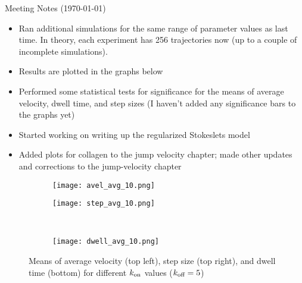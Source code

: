 \documentclass{article}
\newcommand{\tn}{\textnormal}
\begin{document}
\pagestyle{plain}

\begin{center}
  {\Large Meeting Notes (\today)}
\end{center}

\begin{itemize}
\item Ran additional simulations for the same range of parameter
  values as last time. In theory, each experiment has 256 trajectories
  now (up to a couple of incomplete simulations). 
\item Results are plotted in the graphs below
\item Performed some statistical tests for significance for the
  means of average velocity, dwell time, and step sizes (I haven't
  added any significance bars to the graphs yet)
\item Started working on writing up the regularized Stokeslets model
\item Added plots for collagen to the jump velocity chapter; made 
  other updates and corrections to the jump-velocity chapter
\end{itemize}

\begin{figure}[h]
  \centering
  \begin{subfigure}{0.49\textwidth}
    \texttt{[image: avel\_avg\_10.png]}
  \end{subfigure}
  \hfill
  \begin{subfigure}{0.49\textwidth}
    \texttt{[image: step\_avg\_10.png]}
  \end{subfigure}
  \\
  \begin{subfigure}{0.49\textwidth}
    \texttt{[image: dwell\_avg\_10.png]}
  \end{subfigure}
  \label{fig:stats10}
  \caption{Means of average velocity (top left), step size (top
    right), and dwell time (bottom) for different $k_\tn{on}$
    values ($k_\tn{off} = 5$)}
\end{figure}
\end{document}
